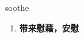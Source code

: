 
\begin{frame}
{\huge soothe}
\begin{center}
\begin{enumerate}\Large
  \item \textbf{带来慰藉，安慰}
\end{enumerate}
\end{center}
\end{frame}
